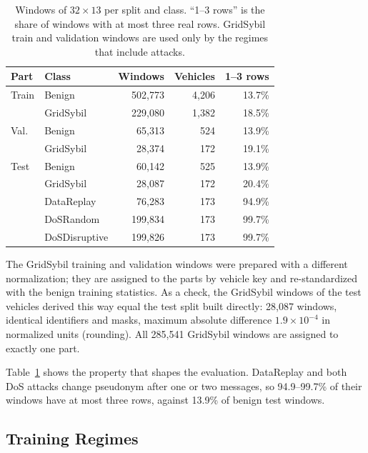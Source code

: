 \begin{table}[t]
\caption{Windows of $32\times13$ per split and class. ``1--3 rows'' is the share of windows with at most three
real rows. GridSybil train and validation windows are used only by the regimes that include attacks.}
\label{tab:data}
\centering
\footnotesize
\setlength{\tabcolsep}{4pt}
\begin{tabular}{@{}llrrr@{}}
\toprule
Part & Class & Windows & Vehicles & 1--3 rows \\
\midrule
Train & Benign        & 502{,}773 & 4{,}206 & 13.7\% \\
      & GridSybil     & 229{,}080 & 1{,}382 & 18.5\% \\
\midrule
Val.  & Benign        &  65{,}313 &   524 & 13.9\% \\
      & GridSybil     &  28{,}374 &   172 & 19.1\% \\
\midrule
Test  & Benign        &  60{,}142 &   525 & 13.9\% \\
      & GridSybil     &  28{,}087 &   172 & 20.4\% \\
      & DataReplay    &  76{,}283 &   173 & 94.9\% \\
      & DoSRandom     & 199{,}834 &   173 & 99.7\% \\
      & DoSDisruptive & 199{,}826 &   173 & 99.7\% \\
\bottomrule
\end{tabular}
\end{table}

The GridSybil training and validation windows were prepared with a different normalization; they are assigned
to the parts by vehicle key and re-standardized with the benign training statistics. As a check, the GridSybil
windows of the test vehicles derived this way equal the test split built directly: 28{,}087 windows, identical
identifiers and masks, maximum absolute difference $1.9\times10^{-4}$ in normalized units (rounding). All
285{,}541 GridSybil windows are assigned to exactly one part.

Table~\ref{tab:data} shows the property that shapes the evaluation. DataReplay and both DoS attacks change
pseudonym after one or two messages, so 94.9--99.7\% of their windows have at most three rows, against
13.9\% of benign test windows.

\subsection{Training Regimes}\label{sec:regimes}

